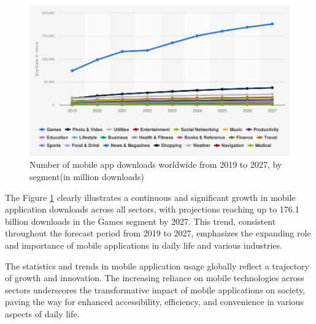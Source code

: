 \begin{figure}[htbp]
    \centering
    \includegraphics[scale = 0.45]{img/num_of_downloads.png}
    \caption{Number of mobile app downloads worldwide from 2019 to 2027, by segment(in million downloads) \cite{statista2023}}
    \label{fig:num_of_downloads}
\end{figure}
\par
The Figure \ref*{fig:num_of_downloads} clearly illustrates a continuous and significant growth in mobile application downloads across all sectors, with projections reaching up to 176.1 billion downloads in the Games segment by 2027. This trend, consistent throughout the forecast period from 2019 to 2027, emphasizes the expanding role and importance of mobile applications in daily life and various industries.
\par
The statistics and trends in mobile application usage globally reflect a trajectory of growth and innovation. The increasing reliance on mobile technologies across sectors underscores the transformative impact of mobile applications on society, paving the way for enhanced accessibility, efficiency, and convenience in various aspects of daily life. 
